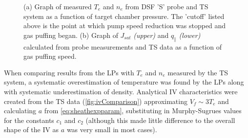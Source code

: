 \documentclass[a4paper, 12pt]{article} %
\begin{document}
	\begin{figure}[t!]
		\vspace{-5pt}
		\caption{
			(a) Graph of measured $T_e$ and $n_e$ from DSF 'S' probe and TS system as a function of target chamber pressure. 
			The 'cutoff' listed above is the point at which pump speed reduction was stopped and gas puffing began. 
			(b) Graph of $J_{sat}$ \textit{(upper)} and $q_{\parallel}$ \textit{(lower)} calculated from probe measurements and TS data as a function of gas puffing speed.
		}
		\vspace{-15pt}
	\end{figure}
	
	When comparing results from the LPs with $T_e$ and $n_e$ measured by the TS system, a systematic overestimation of temperature was found by the LPs along with systematic underestimation of density.
	Analytical IV characteristics were created from the TS data (\cref{fig:ivComparison}) approximating $V_f \sim 3 T_e$\cite{Stangeby2000} and calculating $a$ from \cref{eq:sheathexpparam}, substituting in Murphy-Sugrues values for the constants $c_1$ and $c_2$ (although this made little difference to the overall shape of the IV as $a$ was very small in most cases).
	
\end{document}
